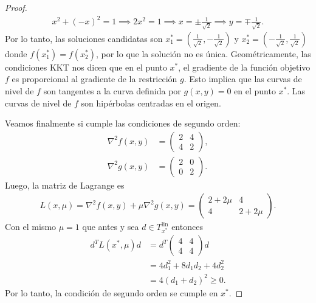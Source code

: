\documentclass{article}
\begin{document}
\begin{proof}
\begin{align*}
        x^2 + {(-x)}^2 = 1 \implies 2x^2 = 1 \implies x = \pm \frac{1}{\sqrt{2}} \implies y = \mp \frac{1}{\sqrt{2}}.
    \end{align*}
    Por lo tanto, las soluciones candidatas son \( x_1^* = \left( \frac{1}{\sqrt{2}}, -\frac{1}{\sqrt{2}} \right) \) y \( x_2^* = \left( -\frac{1}{\sqrt{2}}, \frac{1}{\sqrt{2}} \right) \) donde \( f(x_1^*) = f(x_2^*) \), por lo que la solución no es única.
    Geométricamente, las condiciones KKT nos dicen que en el punto \( x^* \), el gradiente de la función objetivo \( f \) es proporcional al gradiente de la restricción \( g \).
    Esto implica que las curvas de nivel de \( f \) son tangentes a la curva definida por \( g(x, y) = 0 \) en el punto \( x^* \).
    Las curvas de nivel de \( f \) son hipérbolas centradas en el origen.

    Veamos finalmente si cumple las condiciones de segundo orden: \begin{align*}
        \nabla^2 f(x, y) & = \begin{pmatrix}
                                 2 & 4 \\
                                 4 & 2
                             \end{pmatrix}, \\
        \nabla^2 g(x, y) & = \begin{pmatrix}
                                 2 & 0 \\
                                 0 & 2
                             \end{pmatrix}.
    \end{align*}
    Luego, la matriz de Lagrange es \begin{align*}
        L(x, \mu) = \nabla^2 f(x, y) + \mu \nabla^2 g(x, y) = \begin{pmatrix}
                                                                  2 + 2\mu & 4        \\
                                                                  4        & 2 + 2\mu
                                                              \end{pmatrix}.
    \end{align*}
    Con el mismo \( \mu = 1 \) que antes y sea \( d \in T^\text{lin}_{x^*} \) entonces \begin{align*}
        d^T L(x^*, \mu) d & = d^T \begin{pmatrix}
                                      4 & 4 \\
                                      4 & 4
                                  \end{pmatrix} d           \\
                          & = 4 d_1^2 + 8 d_1 d_2 + 4 d_2^2 \\
                          & = 4 {(d_1 + d_2)}^2 \geq 0.
    \end{align*}
    Por lo tanto, la condición de segundo orden se cumple en \( x^* \).
\end{proof}
\end{document}
